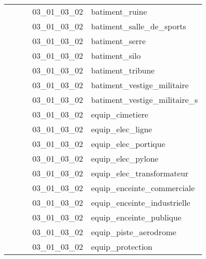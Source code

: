 \documentclass[12pt,titlepage,oneside]{book}
\begin{document}
\begin{supertabular}{|p{7.5cm}|p{7.5cm}|p{7.5cm}|c|p{10cm}|}
                   &                    &                    & 03\_01\_03\_02 & batiment\_ruine\\
                   &                    &                    & 03\_01\_03\_02 & batiment\_salle\_de\_sports\\
                   &                    &                    & 03\_01\_03\_02 & batiment\_serre\\
                   &                    &                    & 03\_01\_03\_02 & batiment\_silo\\
                   &                    &                    & 03\_01\_03\_02 & batiment\_tribune\\
                   &                    &                    & 03\_01\_03\_02 & batiment\_vestige\_militaire\\
                   &                    &                    & 03\_01\_03\_02 & batiment\_vestige\_militaire\_s\\
                   &                    &                    & 03\_01\_03\_02 & equip\_cimetiere\\
                   &                    &                    & 03\_01\_03\_02 & equip\_elec\_ligne\\
                   &                    &                    & 03\_01\_03\_02 & equip\_elec\_portique\\
                   &                    &                    & 03\_01\_03\_02 & equip\_elec\_pylone\\
                   &                    &                    & 03\_01\_03\_02 & equip\_elec\_transformateur\\
                   &                    &                    & 03\_01\_03\_02 & equip\_enceinte\_commerciale\\
                   &                    &                    & 03\_01\_03\_02 & equip\_enceinte\_industrielle\\
                   &                    &                    & 03\_01\_03\_02 & equip\_enceinte\_publique\\
                   &                    &                    & 03\_01\_03\_02 & equip\_piste\_aerodrome\\
                   &                    &                    & 03\_01\_03\_02 & equip\_protection\\

\end{supertabular}
\end{document}
